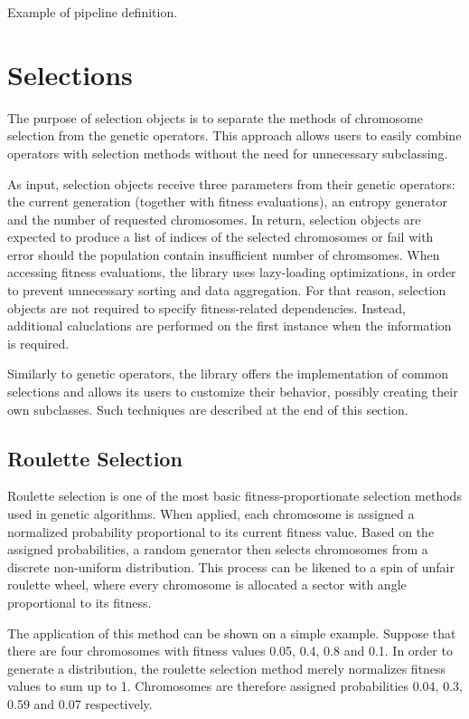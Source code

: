 \begin{listing}[ht]
	\caption{Example of pipeline definition.}
	\label{listing:pipeline-definition}
\end{listing}

\section{Selections}\label{section:selection}
The purpose of selection objects is to separate the methods of chromosome selection from the genetic operators. This approach allows users to easily combine operators with selection methods without the need for unnecessary subclassing.

As input, selection objects receive three parameters from their genetic operators: the current generation (together with fitness evaluations), an entropy generator and the number of requested chromosomes. In return, selection objects are expected to produce a list of indices of the selected chromosomes or fail with error should the population contain insufficient number of chromsomes. When accessing fitness evaluations, the library uses lazy-loading optimizations, in order to prevent unnecessary sorting and data aggregation. For that reason, selection objects are not required to specify fitness-related dependencies. Instead, additional caluclations are performed on the first instance when the information is required.

Similarly to genetic operators, the library offers the implementation of common selections and allows its users to customize their behavior, possibly creating their own subclasses. Such techniques are described at the end of this section.

\subsection{Roulette Selection}
Roulette selection is one of the most basic fitness-proportionate selection methods used in genetic algorithms. When applied, each chromosome is assigned a normalized probability proportional to its current fitness value. Based on the assigned probabilities, a random generator then selects chromosomes from a discrete non-uniform distribution. This process can be likened to a spin of unfair roulette wheel, where every chromosome is allocated a sector with angle proportional to its fitness. \cite{GaConceptsDesigns}

The application of this method can be shown on a simple example. Suppose that there are four chromosomes with fitness values 0.05, 0.4, 0.8 and 0.1. In order to generate a distribution, the roulette selection method merely normalizes fitness values to sum up to 1. Chromosomes are therefore assigned probabilities 0.04, 0.3, 0.59 and 0.07 respectively.

